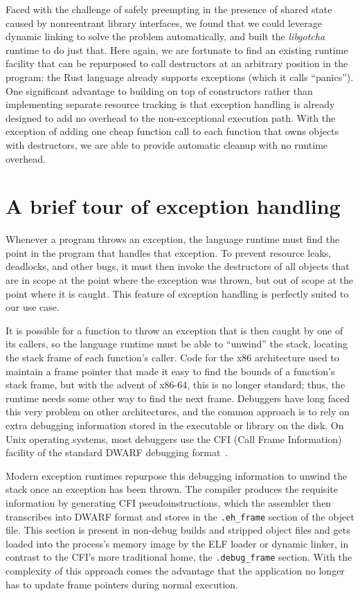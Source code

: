 Faced with the challenge of safely preempting in the presence of shared state caused
by nonreentrant library interfaces, we found that we could leverage dynamic linking
to solve the problem automatically, and built the \textit{libgotcha} runtime to do
just that.  Here again, we are fortunate to find an existing runtime facility that
can be repurposed to call destructors at an arbitrary position in the program:\@
the Rust language already supports exceptions (which it calls ``panics'').  One
significant advantage to building on top of constructors rather than implementing
separate resource tracking is that exception handling is already designed to add no
overhead to the non-exceptional execution path.  With the exception of adding one
cheap function call to each function that owns objects with destructors, we are able
to provide automatic cleanup with no runtime overhead.


\section{A brief tour of exception handling}

Whenever a program throws an exception, the language runtime must find the point in
the program that handles that exception.  To prevent resource leaks, deadlocks, and
other bugs, it must then invoke the destructors of all objects that are in scope at
the point where the exception was thrown, but out of scope at the point where it is
caught.  This feature of exception handling is perfectly suited to our use case.

It is possible for a function to throw an exception that is then caught by one of its
callers, so the language runtime must be able to ``unwind'' the stack, locating the
stack frame of each function's caller.  Code for the x86 architecture used to
maintain a frame pointer that made it easy to find the bounds of a function's stack
frame, but with the advent of x86-64, this is no longer standard; thus, the runtime
needs some other way to find the next frame.  Debuggers have long faced this very
problem on other architectures, and the common approach is to rely on extra debugging
information stored in the executable or library on the disk.  On Unix operating
systems, most debuggers use the CFI (Call Frame Information) facility of the standard
DWARF debugging format~\cite{eager:spec2012}.

Modern exception runtimes repurpose this debugging information to unwind the stack
once an exception has been thrown.  The compiler produces the requisite information
by generating CFI pseudoinstructions, which the assembler then transcribes into DWARF
format and stores in the \texttt{.eh\_frame} section of the object file.  This
section is present in non-debug builds and stripped object files and gets loaded into
the process's memory image by the ELF loader or dynamic linker, in contrast to the
CFI's more traditional home, the \texttt{.debug\_frame} section.  With the complexity
of this approach comes the advantage that the application no longer has to update
frame pointers during normal execution.

